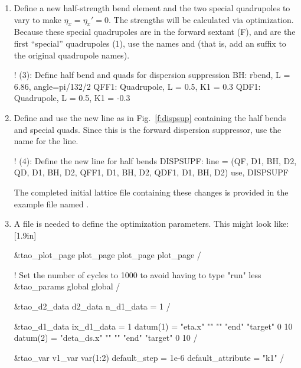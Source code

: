 \documentclass{hitec}     %
\begin{document}
{\begin{enumerate}[leftmargin=*]
\begin{code}
parameter[geometry] = open     ! (2): Set geometry to open  
\end{code}
%
\item Define a new half-strength bend element and the two special quadrupoles to vary to make $\eta_x=\eta_x'=0$. The strengths will be calculated via optimization. Because these special quadrupoles are in the forward sextant (F), and are the first ``special'' quadrupoles (1), use the names  and  (that is, add an  suffix to the original quadrupole names).
%
\begin{code}
! (3): Define half bend and quads for dispersion suppression 
BH: rbend, L = 6.86, angle=pi/132/2
QFF1: Quadrupole, L = 0.5, K1 = 0.3
QDF1: Quadrupole, L = 0.5, K1 = -0.3
\end{code}
%
\item Define and use the new line as in Fig.~\ref{f:dispsup} containing the half bends and special quads. Since this is the forward dispersion suppressor, use the name  for the line. 
\begin{code} 
! (4): Define the new line for half bends
DISPSUPF: line = (QF, D1, BH, D2, QD, D1, BH, D2,
                  QFF1, D1, BH, D2, QDF1, D1, BH, D2)
use, DISPSUPF
\end{code}
The completed initial lattice file containing these changes is provided in the example file named . 
%
\item
A  file is needed to define the optimization parameters. This might look like:
[1.9in]
%
\begin{code}
&tao_plot_page
  plot_page%
  plot_page%
  plot_page%
/

! Set the number of cycles to 1000 to avoid having to type "run" less
&tao_params
  global%
  global%
/

&tao_d2_data
    d2_data%
    n_d1_data = 1
/

&tao_d1_data
  ix_d1_data = 1
  datum(1) = "eta.x" "" "" "end" "target" 0 10
  datum(2) = "deta_ds.x" "" "" "end" "target" 0 10
/

&tao_var
  v1_var%
  var(1:2)%
  default_step = 1e-6
  default_attribute = "k1"
/
\end{code}


\end{enumerate}}
\end{document}

